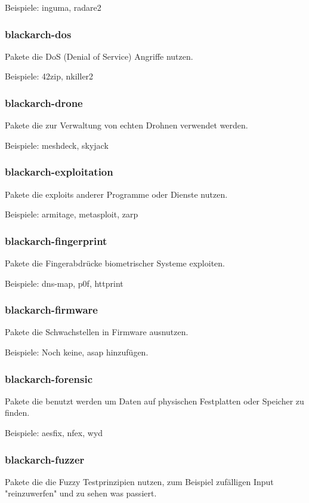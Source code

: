 \documentclass[a4paper, oneside, 11pt]{book}
\begin{document}
Beispiele: inguma, radare2

\subsubsection{blackarch-dos}
Pakete die DoS (Denial of Service) Angriffe nutzen.

Beispiele: 42zip, nkiller2

\subsubsection{blackarch-drone}
Pakete die zur Verwaltung von echten Drohnen verwendet werden.

Beispiele: meshdeck, skyjack

\subsubsection{blackarch-exploitation}
Pakete die exploits anderer Programme oder Dienste nutzen.

Beispiele: armitage, metasploit, zarp

\subsubsection{blackarch-fingerprint}
Pakete die Fingerabdrücke biometrischer Systeme exploiten.

Beispiele: dns-map, p0f, httprint

\subsubsection{blackarch-firmware}
Pakete die Schwachstellen in Firmware ausnutzen.

Beispiele: Noch keine, asap hinzufügen.

\subsubsection{blackarch-forensic}
Pakete die benutzt werden um Daten auf physischen Festplatten oder Speicher zu finden.

Beispiele: aesfix, nfex, wyd

\subsubsection{blackarch-fuzzer}
Pakete die die Fuzzy Testprinzipien nutzen, zum Beispiel
zufälligen Input "reinzuwerfen" und zu sehen was passiert.
\end{document}
